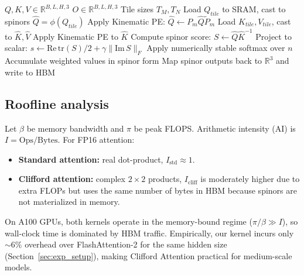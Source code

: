 \documentclass{article}
\theoremstyle{plain}
\theoremstyle{definition}
\theoremstyle{remark}
\newcommand{\R}{\mathbb{R}}
\begin{document}
\begin{algorithm}[t]
   \caption{Fused Clifford Attention Kernel (Triton)}
   \label{alg:clifford_triton}
\begin{algorithmic}[1]
    $Q,K,V \in \R^{B,L,H,3}$
    $O \in \R^{B,L,H,3}$
   \STATE Tile sizes $T_M, T_N$
       \STATE Load $Q_{tile}$ to SRAM, cast to spinors $\hat{Q}=\phi(Q_{tile})$
       \STATE Apply Kinematic PE: $\hat{Q} \leftarrow P_m \hat{Q} \tilde{P}_m$
           \STATE Load $K_{tile},V_{tile}$, cast to $\hat{K},\hat{V}$
           \STATE Apply Kinematic PE to $\hat{K}$
           \STATE Compute spinor score: $S \leftarrow \hat{Q}\hat{K}^{-1}$
           \STATE Project to scalar: $s \leftarrow \mathrm{Re}\,\mathrm{tr}(S)/2 + \gamma \|\mathrm{Im}\,S\|_F$
           \STATE Apply numerically stable softmax over $n$
           \STATE Accumulate weighted values in spinor form
       \ENDFOR
       \STATE Map spinor outputs back to $\R^3$ and write to HBM
   \ENDFOR
\end{algorithmic}
\end{algorithm}

\subsection{Roofline analysis}

Let $\beta$ be memory bandwidth and $\pi$ be peak FLOPS. Arithmetic intensity (AI) is $I = \mathrm{Ops}/\mathrm{Bytes}$. For FP16 attention:

\begin{itemize}
    \item \textbf{Standard attention:} real dot-product, $I_{\text{std}} \approx 1$.
    \item \textbf{Clifford attention:} complex $2\times2$ products, $I_{\text{cliff}}$ is moderately higher due to extra FLOPs but uses the same number of bytes in HBM because spinors are not materialized in memory.
\end{itemize}

On A100 GPUs, both kernels operate in the memory-bound regime ($\pi/\beta \gg I$), so wall-clock time is dominated by HBM traffic. Empirically, our kernel incurs only $\sim 6\%$ overhead over FlashAttention-2 for the same hidden size (Section~\ref{sec:exp_setup}), making Clifford Attention practical for medium-scale models.
\end{document}
